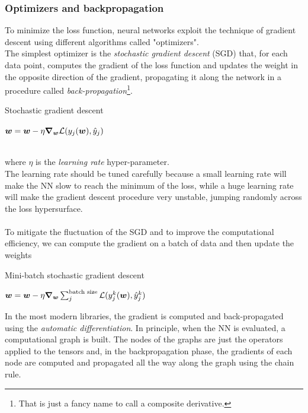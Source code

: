 \subsubsection*{Optimizers and backpropagation}
To minimize the loss function, neural networks exploit the technique of gradient descent using different algorithms called "optimizers".\\
The simplest optimizer is the \textit{stochastic gradient descent} (SGD) that, for each data point, computes the gradient of the loss function and updates the weight in the opposite direction of the gradient, propagating it along the network in a procedure called \textit{back-propagation}\footnote{That is just a fancy name to call a composite derivative.}.
\begin{algorithm}
\caption{Stochastic gradient descent}\label{algo:SGD}
\begin{algorithmic}[1]
            \State $\bm{w}=\bm{w}-\eta \grad_{\bm{w}} \mathcal{L}(y_j(\bm{w}),\hat{y}_j)$
        \EndFor
    \EndFor
\end{algorithmic}
\end{algorithm}\\
where $\eta$ is the \textit{learning rate} hyper-parameter.\\
The learning rate should be tuned carefully because a small learning rate will make the NN slow to reach the minimum of the loss, while a huge learning rate will make the gradient descent procedure very  unstable, jumping randomly across the loss hypersurface.\\
\\
To mitigate the fluctuation of the SGD and to improve the computational efficiency, we can compute the gradient on a batch of data and then update the weights
\begin{algorithm}[H]
\caption{Mini-batch stochastic gradient descent}\label{algo:miniSGD}
\begin{algorithmic}[1]
            \State $\bm{w}=\bm{w}-\eta \grad_{\bm{w}} \sum_j^{\text{batch size}} \mathcal{L}(y_j^k(\bm{w}),\hat{y}_j^k)$
        \EndFor
    \EndFor
\end{algorithmic}
\end{algorithm}
In the most modern libraries, the gradient is computed and back-propagated using the \textit{automatic differentiation}.
In principle, when the NN is evaluated, a computational graph is built. The nodes of the graphs are just the operators applied to the tensors and, in the backpropagation phase, the gradients of each node are computed and propagated all the way along the graph using the chain rule.\\
